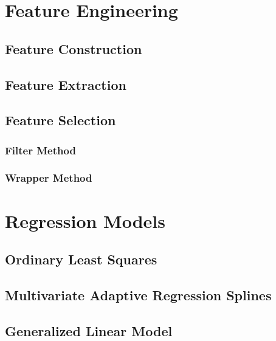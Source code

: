 \documentclass[12pt,]{krantz}
\theoremstyle{definition}
\theoremstyle{definition}
\theoremstyle{definition}
\theoremstyle{remark}
\begin{document}
\chapter{Feature Engineering}\label{feature-engineering}

\section{Feature Construction}\label{feature-construction}

\section{Feature Extraction}\label{feature-extraction}

\section{Feature Selection}\label{feature-selection}

\subsection{Filter Method}\label{filter-method}

\subsection{Wrapper Method}\label{wrapper-method}

\chapter{Regression Models}\label{regression-models}

\section{Ordinary Least Squares}\label{ordinary-least-squares}

\section{Multivariate Adaptive Regression
Splines}\label{multivariate-adaptive-regression-splines}

\section{Generalized Linear Model}\label{generalized-linear-model}
\end{document}
